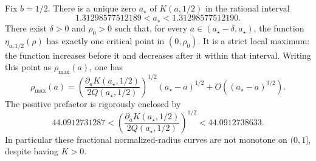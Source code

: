 \begin{theorem}
\label{turn:thm:maximum}
Fix $b=1/2$. There is a unique zero $a_\star$ of $K(a,1/2)$ in
the rational interval
\begin{equation}\label{turn:eq:abracket}
 1.31298577512189<a_\star<1.31298577512190.
\end{equation}
There exist $\delta>0$ and $\rho_0>0$ such that, for every
$a\in(a_\star-\delta,a_\star)$, the function
$\eta_{a,1/2}(\rho)$ has exactly one critical point in
$(0,\rho_0)$. It is a strict local maximum: the function increases
before it and decreases after it within that interval.
Writing this point as $\rho_{\max}(a)$, one has
\begin{equation}\label{turn:eq:maximumscale}
 \rho_{\max}(a)
 =\left(\frac{\partial_aK(a_\star,1/2)}
                    {2Q(a_\star,1/2)}\right)^{1/2}
       (a_\star-a)^{1/2}
       +O((a_\star-a)^{3/2}).
\end{equation}
The positive prefactor is rigorously enclosed by
\[
 44.0912731287<
 \left(\frac{\partial_aK(a_\star,1/2)}
                    {2Q(a_\star,1/2)}\right)^{1/2}
 <44.0912738633.
\]
In particular these fractional normalized-radius curves are not
monotone on $(0,1]$, despite having $K>0$.
\end{theorem}

